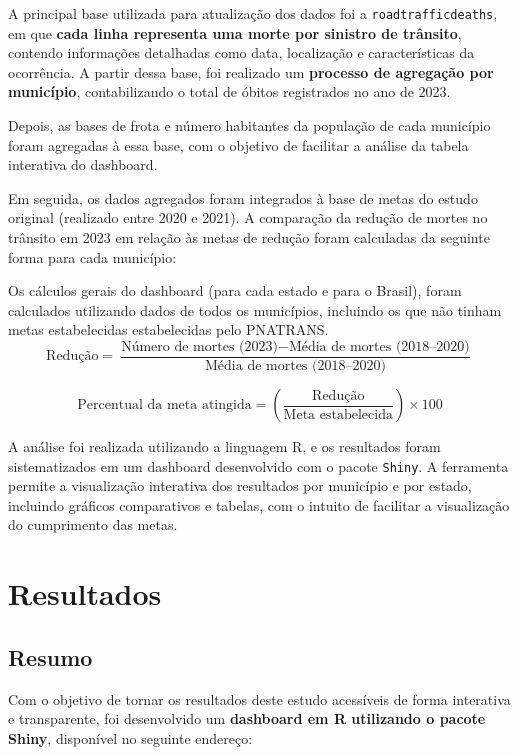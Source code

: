 \documentclass[
  letterpaper,
  DIV=11,
  numbers=noendperiod]{scrreprt}
\begin{document}
A principal base utilizada para atualização dos dados foi a
\texttt{roadtrafficdeaths}, em que \textbf{cada linha representa uma
morte por sinistro de trânsito}, contendo informações detalhadas como
data, localização e características da ocorrência. A partir dessa base,
foi realizado um \textbf{processo de agregação por município},
contabilizando o total de óbitos registrados no ano de 2023.

Depois, as bases de frota e número habitantes da população de cada
município foram agregadas à essa base, com o objetivo de facilitar a
análise da tabela interativa do dashboard.

Em seguida, os dados agregados foram integrados à base de metas do
estudo original (realizado entre 2020 e 2021). A comparação da redução
de mortes no trânsito em 2023 em relação às metas de redução foram
calculadas da seguinte forma para cada município:

Os cálculos gerais do dashboard (para cada estado e para o Brasil),
foram calculados utilizando dados de todos os municípios, incluindo os
que não tinham metas estabelecidas estabelecidas pelo PNATRANS. \[
\text{Redução} = \frac{\text{Número de mortes (2023)} - \text{Média de mortes (2018–2020)}}{\text{Média de mortes (2018–2020)}}
\]

\[
\text{Percentual da meta atingida} = \left( \frac{\text{Redução}}{\text{Meta estabelecida}} \right) \times 100
\]

A análise foi realizada utilizando a linguagem R, e os resultados foram
sistematizados em um dashboard desenvolvido com o pacote \texttt{Shiny}.
A ferramenta permite a visualização interativa dos resultados por
município e por estado, incluindo gráficos comparativos e tabelas, com o
intuito de facilitar a visualização do cumprimento das metas.


\chapter{Resultados}\label{resultados}

\section{Resumo}\label{resumo-1}

Com o objetivo de tornar os resultados deste estudo acessíveis de forma
interativa e transparente, foi desenvolvido um \textbf{dashboard em R
utilizando o pacote Shiny}, disponível no seguinte endereço:
\end{document}
